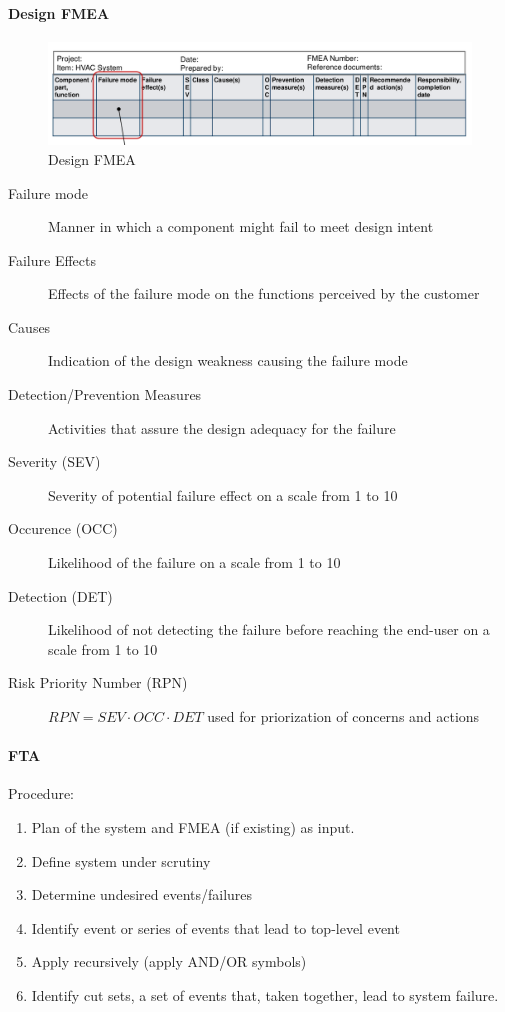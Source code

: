 \paragraph{Design FMEA}
\begin{figure}[H]
  \centering
  \includegraphics[width=\textwidth]{images/design_fmea.png}
  \caption{Design FMEA}
\end{figure}
\begin{description}
  \item[Failure mode] Manner in which a component might fail to meet design intent
  \item[Failure Effects] Effects of the failure mode on the functions perceived by the customer
  \item[Causes] Indication of the design weakness causing the failure mode
  \item[Detection/Prevention Measures] Activities that assure the design adequacy for the failure
  \item[Severity (SEV)] Severity of potential failure effect on a scale from 1 to 10
  \item[Occurence (OCC)] Likelihood of the failure on a scale from 1 to 10
  \item[Detection (DET)] Likelihood of not detecting the failure before reaching the end-user on a scale from 1 to 10
  \item[Risk Priority Number (RPN)] $RPN = SEV \cdot OCC \cdot DET$ used for priorization of concerns and actions
\end{description}

\paragraph{FTA}
Procedure:
\begin{enumerate}
  \item Plan of the system and FMEA (if existing) as input.
  \item Define system under scrutiny
  \item Determine undesired events/failures
  \item Identify event or series of events that lead to top-level event
  \item Apply recursively (apply AND/OR symbols)
  \item Identify cut sets, a set of events that, taken together, lead to system failure.
\end{enumerate}

